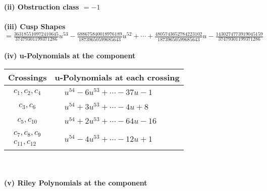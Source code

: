 \documentclass[1p]{elsarticle_modified}
\theoremstyle{definition}
\begin{document}
\flushleft \textbf{(ii) Obstruction class $= -1$}\\~\\
\flushleft \textbf{(iii) Cusp Shapes $= \frac{363185510972410645}{37479301199371286} u^{53}-\frac{688675840018976189}{18739650599685643} u^{52}+\cdots+\frac{4805743652784223102}{18739650599685643} u-\frac{1430274773919045159}{37479301199371286}$}\\~\\
\newpage\renewcommand{\arraystretch}{1}
\flushleft \textbf{(iv) u-Polynomials at the component}\newline \\
\begin{tabular}{m{50pt}|m{274pt}}
Crossings & \hspace{64pt}u-Polynomials at each crossing \\
\hline $$\begin{aligned}c_{1},c_{2},c_{4}\end{aligned}$$&$\begin{aligned}
&u^{54}-6 u^{53}+\cdots-37 u-1
\end{aligned}$\\
\hline $$\begin{aligned}c_{3},c_{6}\end{aligned}$$&$\begin{aligned}
&u^{54}+3 u^{53}+\cdots-4 u+8
\end{aligned}$\\
\hline $$\begin{aligned}c_{5},c_{10}\end{aligned}$$&$\begin{aligned}
&u^{54}+2 u^{53}+\cdots-64 u-16
\end{aligned}$\\
\hline $$\begin{aligned}c_{7},c_{8},c_{9}\\c_{11},c_{12}\end{aligned}$$&$\begin{aligned}
&u^{54}-4 u^{53}+\cdots-12 u+1
\end{aligned}$\\
\hline
\end{tabular}\\~\\
\newpage\renewcommand{\arraystretch}{1}
\flushleft \textbf{(v) Riley Polynomials at the component}\newline \\
\end{document}
